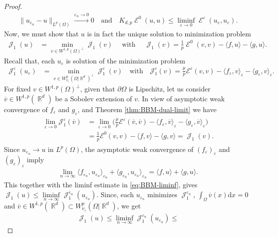 \documentclass[12pt, reqno]{amsart}%
\theoremstyle{plain}  %
\theoremstyle{definition}  %
\numberwithin{equation}{section}
\DeclareMathOperator{\cE}{\mathcal{E}}
\DeclareMathOperator{\cJ}{\mathcal{J}}
\DeclareMathOperator{\R}{\mathbb{R}}
\renewcommand{\d}{\mathrm{d}}
\newcommand{\eps}{\varepsilon}
\newcommand{\WnuOmRa}{W^p_{\nu_\eps}(\Omega|\R^d )}
\begin{document}
\begin{proof}
\begin{align}
\|u_{\eps_n} -u\|_{L^p(\Omega)}\xrightarrow{\eps_n\to0}0\quad \text{and}\quad
K_{d,p}\cE^0(u,u)\leq \liminf_{\eps\to0}\cE^\eps(u_\eps, u_\eps).
\end{align}
 Now, we must show that $u$
is in fact the unique solution  to minimization problem
\begin{align*}
\cJ_1(u)&= \min_{v\in W^{1,p}(\Omega)^\perp} \cJ_1(v)\quad \text{ with }\quad
\cJ_1(v) = \tfrac{1}{p} \cE^0(v,v)  -\langle f, u\rangle- \langle g, u\rangle.
\end{align*}
Recall that, each $u_\eps$ is solution of the minimization problem
\begin{align*}
\cJ^\eps_1(u_\eps)&= \min_{v\in \WnuOmRa^\perp } \cJ^\eps_1(v) \,\,\, \, \text{ with }\,\,\,\,
\mathcal{J}^\eps_1(v) = \tfrac{\mu}{p} \mathcal{E}^\eps(v,v) - \langle f_\eps, v\rangle_\eps - \langle g_\eps, v\rangle_\eps.
\end{align*}
 For fixed  $v\in W^{1,p}(\Omega)^\perp$, given that  $\partial \Omega$ is Lipschitz, let us consider $\overline{v}\in W^{1,p}(\R^d)$ be a Sobolev  extension of $v$.
 In view of asymptotic weak convergence of $f_\eps$ and $g_\eps$, and  Theorem \ref{thm:BBM-dual-limit} we have
\begin{align}\label{eq:limsup-J}
\begin{split}
\lim_{\eps\to0}\mathcal{J}^\eps_1(\overline{v})
&= \lim_{\eps\to0}\big(\tfrac{\mu}{p} \mathcal{E}^\eps(\overline{v},\overline{v}) -\langle f_\eps, \overline{v} \rangle_\eps - \langle g_\eps, \overline{v}\rangle_\eps\big) \\
&=\tfrac{1}{p}\mathcal{E}^0(v,v)-  \langle f, v\rangle- \langle g, v\rangle= \cJ_1(v).
\end{split}
\end{align}
Since  $u_{\eps_n}\to u$ in $L^p(\Omega)$, the asymptotic weak convergence of $(f_\eps)_\eps$ and $(g_\eps)_\eps$ imply
\begin{align*}
\lim_{n\to\infty}\langle f_{\eps_n}, u_{\eps_n}\rangle_{\eps_n}
+  \langle g_{\eps_n}, u_{\eps_n}\rangle_{\eps_n}= \langle f, u\rangle+ \langle g, u\rangle.
\end{align*}
This together with the liminf estimate in \eqref{eq:BBM-liminf}, gives $\cJ_1(u)
\leq\liminf\limits_{n \to \infty} \cJ^{\eps_n}_1(u_{\eps_n}).$ Since,  each $u_{\eps_n}$ minimizes $\cJ^{\eps_n}_1$, $\int_\Omega \overline{v}(x)\d x=0$ and   $\overline{v}\in W^{1,p}(\R^d)\subset \WnuOmRa$, we get
\begin{align*}
\cJ_1(u)\leq \liminf_{n\to \infty}\cJ^{\eps_n}_1(u_{\eps_n})\leq

\end{align*}
\end{proof}
\end{document}
